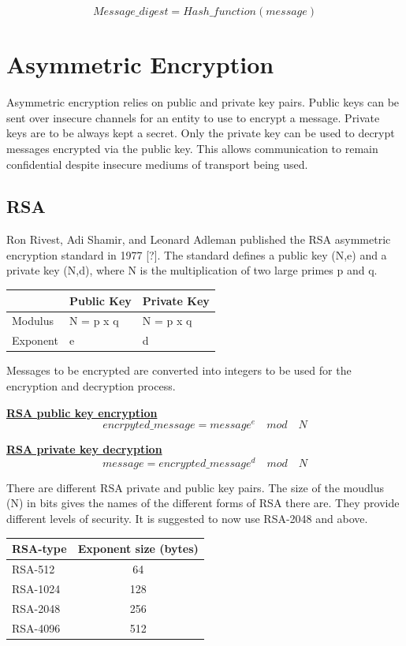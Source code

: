 \documentclass[bsc,frontabs,twoside,singlespacing,parskip,deptreport]{infthesis}     %
\begin{document}
$$ Message\_digest = Hash\_function(message) $$


\section{Asymmetric Encryption}

Asymmetric encryption relies on public and private key pairs. Public keys can be sent over insecure channels for an entity to use to encrypt a message. Private keys are to be always kept a secret. Only the private key can be used to decrypt messages encrypted via the public key. This allows communication to remain confidential despite insecure mediums of transport being used.

\subsection{RSA}
Ron Rivest, Adi Shamir, and Leonard Adleman published the RSA asymmetric encryption standard in 1977 [?]. The standard defines a public key (N,e) and a private key (N,d), where N is the multiplication of two large primes p and q. 

\begin{table}[H]
\begin{tabular}{|l|l|l|}
\hline
 & Public Key & Private Key\\
\hline
Modulus & N = p x q & N = p x q\\
\hline
Exponent & e & d\\
\hline
\end{tabular}
\end{table}

Messages to be encrypted are converted into integers to be used for the encryption and decryption process.

\underline{\textbf{RSA public key encryption}}\\
$$ encrpyted\_message =  message^e  \quad mod \quad N $$

\underline{\textbf{RSA private key decryption}}\\
$$ message =  encrypted\_message^d  \quad mod \quad N $$

There are different RSA private and public key pairs. The size of the moudlus (N) in bits gives the names of the different forms of RSA there are. They provide different levels of security. It is suggested to now use RSA-2048 and above.

\begin{table}[H]
\begin{tabular}{|l|c|}
\hline
RSA-type & Exponent size (bytes)\\
\hline
RSA-512 & 64\\
RSA-1024 & 128\\
RSA-2048 & 256\\
RSA-4096 & 512\\
\hline
\end{tabular}
\end{table}
\end{document}
